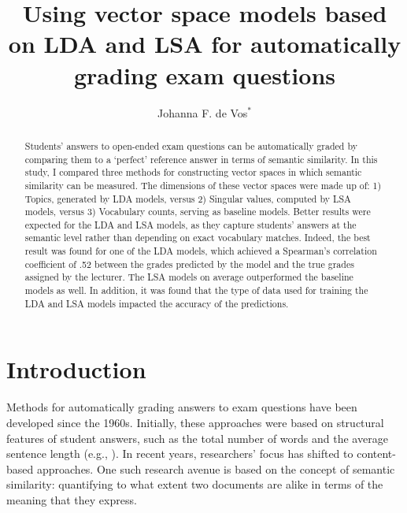 \documentclass[a4paper,10pt,twoside]{article}
\begin{document}
\title{Using vector space models based on LDA and LSA for automatically grading exam questions}

\author{Johanna F. de Vos$^*$ 
\AND {}}


\maketitle\thispagestyle{empty} %


\begin{abstract}
Students' answers to open-ended exam questions can be automatically graded by comparing them to a `perfect' reference answer in terms of semantic similarity. In this study, I compared three methods for constructing vector spaces in which semantic similarity can be measured. The dimensions of these vector spaces were made up of: 1) Topics, generated by LDA models, versus 2) Singular values, computed by LSA models, versus 3) Vocabulary counts, serving as baseline models. Better results were expected for the LDA and LSA models, as they capture students' answers at the semantic level rather than depending on exact vocabulary matches. Indeed, the best result was found for one of the LDA models, which achieved a Spearman's correlation coefficient of .52 between the grades predicted by the model and the true grades assigned by the lecturer. The LSA models on average outperformed the baseline models as well. In addition, it was found that the type of data used for training the LDA and LSA models impacted the accuracy of the predictions.
\end{abstract}

\section{Introduction}

Methods for automatically grading answers to exam questions have been developed since the 1960s. Initially, these approaches were based on structural features of student answers, such as the total number of words and the average sentence length (e.g., ). In recent years, researchers' focus has shifted to content-based approaches. One such research avenue is based on the concept of semantic similarity: quantifying to what extent two documents are alike in terms of the meaning that they express.
\end{document}
